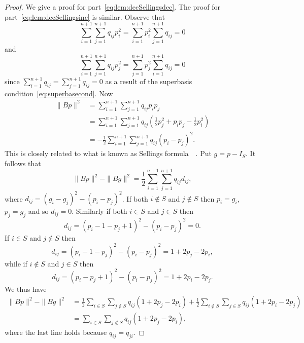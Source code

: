 \documentclass[final,leqno]{siamltex}
\begin{document}
\begin{proof}
We give a proof for part~\ref{eq:lem:decSellingsdec}.  The proof for part~\ref{eq:lem:decSellingsinc} is similar.  Observe that
\[
\sum_{i=1}^{n+1}\sum_{j=1}^{n+1} q_{ij} p_i^2 =  \sum_{i=1}^{n+1}p_i^2\sum_{j=1}^{n+1} q_{ij} = 0
\]
and
\[
\sum_{i=1}^{n+1}\sum_{j=1}^{n+1} q_{ij} p_j^2 =  \sum_{j=1}^{n+1}p_j^2\sum_{i=1}^{n+1} q_{ij} = 0
\]
since $\sum_{i=1}^{n+1} q_{ij} = \sum_{j=1}^{n+1} q_{ij} = 0$ as a result of the superbasis condition~\eqref{eq:superbasecond}.  Now
\begin{align*}
\|Bp\|^2 &= \sum_{i=1}^{n+1} \sum_{j=1}^{n+1} q_{ij} p_i p_j \\
&= \sum_{i=1}^{n+1} \sum_{j=1}^{n+1} q_{ij} (\tfrac{1}{2}p_j^2 + p_i p_j -  \tfrac{1}{2}p_i^2) \\
&= -\frac{1}{2} \sum_{i=1}^{n+1} \sum_{j=1}^{n+1} q_{ij} (p_i - p_j)^2.
\end{align*}
This is closely related to what is known as Sellings formula~\cite[Proposition 2.3.1]{Valentin2003_coverings_tilings_low_dimension}~\cite{Selling1874}.  Put $g = p - I_S$.  It follows that
\[
\|Bp\|^2 - \|Bg\|^2 = \frac{1}{2} \sum_{i=1}^{n+1}\sum_{j=1}^{n+1}q_{ij}d_{ij},
\]
where $d_{ij} = (g_i - g_j)^2 - (p_i - p_j)^2$.  If both $i \notin S$ and $j \notin S$ then $p_i = g_i$, $p_j = g_j$ and so $d_{ij} = 0$.  Similarly if both $i \in S$ and $j \in S$ then 
\[
d_{ij} = (p_i-1 - p_j+1)^2 - (p_i - p_j)^2 = 0.
\]
If $i \in S$ and $j \notin S$ then
\[
d_{ij} = (p_i-1 - p_j)^2 - (p_i - p_j)^2= 1 + 2p_j - 2p_i,
\]
while if $i \notin S$ and $j \in S$ then
\[
d_{ij} = (p_i - p_j+1)^2 - (p_i - p_j)^2 = 1 + 2p_i - 2p_j.
\]
We thus have
\begin{align*}
\|Bp\|^2 - \|Bg\|^2 &= \frac{1}{2} \sum_{i \in S}\sum_{j \notin S}q_{ij}(1 + 2p_j - 2p_i) + \frac{1}{2} \sum_{i \notin S}\sum_{j \in S}q_{ij}(1 + 2p_i - 2p_j) \\
&= \sum_{i \in S}\sum_{j \notin S}q_{ij}(1 + 2p_j - 2p_i),
\end{align*}
where the last line holds because $q_{ij} = q_{ji}$.
\end{proof}
\end{document}

